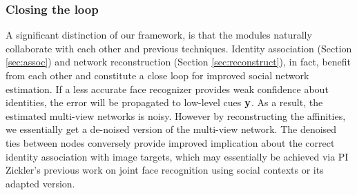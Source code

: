 
\subsubsection{Closing the loop}
\label{sec:closeloop}

A significant distinction of our framework, is that the modules naturally collaborate with each other and previous techniques. Identity association (Section \ref{sec:assoc}) and network reconstruction (Section \ref{sec:reconstruct}), in fact, benefit from each other and constitute a close loop for improved social network estimation. If a less accurate face recognizer provides weak confidence about identities, the error will be propagated to low-level cues ${\bf y}$. As a result, the estimated multi-view networks is noisy. However by reconstructing the affinities, we essentially get a de-noised version of the multi-view network. The denoised ties between nodes conversely provide improved implication about the correct identity association with image targets, which may essentially be achieved via PI Zickler's previous work on joint face recognition using social contexts \cite{Stone2008,Stone2010} or its adapted version. 